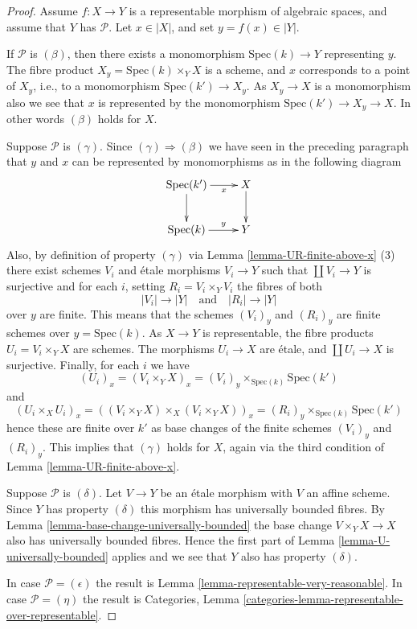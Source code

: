 \begin{proof}
Assume $f : X \to Y$ is a representable morphism of algebraic spaces,
and assume that $Y$ has $\mathcal{P}$. Let $x \in |X|$, and set
$y = f(x) \in |Y|$.

\medskip\noindent
If $\mathcal{P}$ is $(\beta)$, then there exists a monomorphism
$\text{Spec}(k) \to Y$ representing $y$. The fibre product
$X_y = \text{Spec}(k) \times_Y X$ is a scheme, and $x$ corresponds
to a point of $X_y$, i.e., to a monomorphism $\text{Spec}(k') \to X_y$.
As $X_y \to X$ is a monomorphism also we see that $x$ is represented
by the monomorphism $\text{Spec}(k') \to X_y \to X$. In other words
$(\beta)$ holds for $X$.

\medskip\noindent
Suppose $\mathcal{P}$ is $(\gamma)$. Since $(\gamma) \Rightarrow (\beta)$
we have seen in the preceding paragraph that $y$ and $x$ can be represented
by monomorphisms as in the following diagram
$$
\xymatrix{
\text{Spec}(k') \ar[r]_-x \ar[d] & X \ar[d] \\
\text{Spec}(k) \ar[r]^-y & Y
}
$$
Also, by definition of property $(\gamma)$ via
Lemma \ref{lemma-UR-finite-above-x} (3)
there exist schemes
$V_i$ and \'etale morphisms $V_i \to Y$ such that $\coprod V_i \to Y$
is surjective and for each $i$, setting $R_i = V_i \times_Y V_i$
the fibres of both
$$
|V_i| \longrightarrow |Y|
\quad\text{and}\quad
|R_i| \longrightarrow |Y|
$$
over $y$ are finite. This means that the schemes
$(V_i)_y$ and $(R_i)_y$ are finite schemes over $y = \text{Spec}(k)$.
As $X \to Y$ is representable, the fibre products $U_i = V_i \times_Y X$
are schemes. The morphisms $U_i \to X$ are \'etale, and
$\coprod U_i \to X$ is surjective. Finally, for each $i$ we have
$$
(U_i)_x =
(V_i \times_Y X)_x =
(V_i)_y \times_{\text{Spec}(k)} \text{Spec}(k')
$$
and
$$
(U_i \times_X U_i)_x =
\left((V_i \times_Y X) \times_X (V_i \times_Y X)\right)_x =
(R_i)_y \times_{\text{Spec}(k)} \text{Spec}(k')
$$
hence these are finite over $k'$ as base changes of the finite
schemes $(V_i)_y$ and $(R_i)_y$. This implies that $(\gamma)$ holds for $X$,
again via the third condition of
Lemma \ref{lemma-UR-finite-above-x}.

\medskip\noindent
Suppose $\mathcal{P}$ is $(\delta)$. Let $V \to Y$ be an \'etale morphism with
$V$ an affine scheme. Since $Y$ has property $(\delta)$ this morphism has
universally bounded fibres. By
Lemma \ref{lemma-base-change-universally-bounded}
the base change $V \times_Y X \to X$ also has universally bounded fibres.
Hence the first part of
Lemma \ref{lemma-U-universally-bounded}
applies and we see that $Y$ also has property $(\delta)$.

\medskip\noindent
In case $\mathcal{P} = (\epsilon)$ the result is
Lemma \ref{lemma-representable-very-reasonable}.
In case $\mathcal{P} = (\eta)$ the result is
Categories, Lemma \ref{categories-lemma-representable-over-representable}.
\end{proof}






